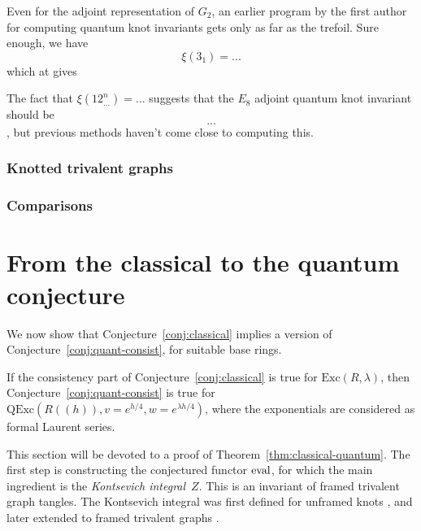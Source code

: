 \documentclass[12pt]{amsart}
\begin{document}
Even for the adjoint representation of $G_2$, an earlier program by the first
author for computing quantum knot invariants gets only as far as the trefoil. 
Sure enough, we have
$$\xi(3_1) = ...$$
which at  gives 


The fact that $\xi(12^n_{...}) = ...$ suggests that the $E_8$ adjoint quantum 
knot invariant should be $$...$$, but previous methods haven't come close to
computing this.

\subsubsection{Knotted trivalent graphs}\mbox{}%

\subsubsection{Comparisons}

\section{From the classical to the quantum conjecture}
\label{sec:classical-quantum}

We now show that Conjecture~\ref{conj:classical} implies
a version of Conjecture~\ref{conj:quant-consist}, for suitable base
rings.
\begin{theorem}\label{thm:classical-quantum}
  If the consistency part of Conjecture~\ref{conj:classical} is true
  for $\mathrm{Exc}(R,\lambda)$, then
  Conjecture~\ref{conj:quant-consist} is true for
  $\mathrm{QExc}(R((h)),v=e^{h/4},w=e^{\lambda h/4})$, where the
  exponentials are considered as formal Laurent series.
\end{theorem}
This section will be devoted to a proof of
Theorem~\ref{thm:classical-quantum}. The first step is constructing
the conjectured functor $\operatorname{eval}$, for which the main ingredient is the
\emph{Kontsevich integral}~$Z$. This is an invariant of framed
trivalent graph tangles. The Kontsevich integral was
first defined for unframed knots \cite{MR1318886}, and later extended
to framed trivalent graphs \cite{MR1473309,MR2304469,MR2661529}.
\end{document}
